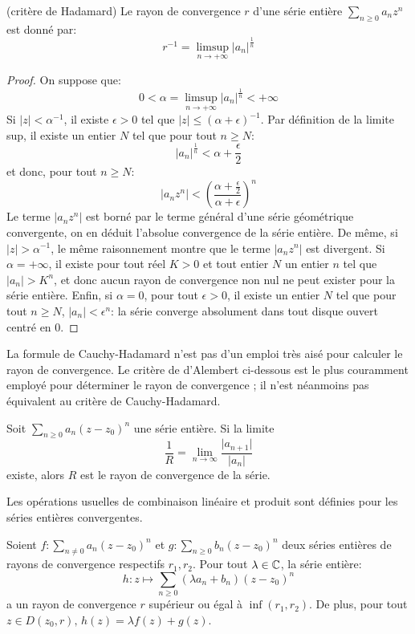 \begin{fprop}(critère de Hadamard)
Le rayon de convergence $r$ d'une série entière $\sum_{n \geq 0} a_n z^n$ est
donné par:
\[
r^{-1}=\limsup_{n \to +\infty} |a_n|^{\frac{1}{n}}
\]
\end{fprop}
\begin{proof}
On suppose que: 
\[
0 < \alpha = \limsup_{n \to +\infty} |a_n|^{\frac{1}{n}} <
+\infty
\]
Si $|z|<\alpha^{-1}$, il existe $\epsilon > 0$ tel que $|z|\leq
(\alpha+\epsilon)^{-1}$. Par définition de la limite sup, il existe un entier
$N$ tel que pour tout $n \geq N$:
\[
|a_n|^{\frac{1}{n}} < \alpha + \frac{\epsilon}{2}
\]
et donc, pour tout $n \geq N$:
\[
\left|a_nz^n\right|< \left(\frac{\alpha + \frac{\epsilon}{2}}{\alpha +
\epsilon}\right)^n
\]
Le terme $|a_nz^n|$ est borné par le terme général d'une série géométrique
convergente, on  en déduit l'absolue convergence de la série entière.
De même, si $|z|> \alpha^{-1}$, le même raisonnement montre que le terme
$\left|a_nz^n\right|$ est divergent. Si $\alpha = +\infty$, il existe pour tout
réel $K>0$ et tout entier $N$ un entier $n$ tel que $|a_n|>K^n$, et donc aucun
rayon de convergence non nul ne peut exister pour la série entière. Enfin, si
$\alpha = 0$, pour tout $\epsilon > 0$, il existe un entier $N$ tel que pour
tout $n \geq N$, $|a_n|<\epsilon^n$: la série converge absolument dans tout
disque ouvert centré en 0.
\end{proof}
La formule de Cauchy-Hadamard n'est pas d'un emploi très aisé pour calculer le rayon de convergence. Le critère de d'Alembert ci-dessous est le plus couramment employé pour déterminer le rayon de
convergence ; il n'est néanmoins pas équivalent au critère de Cauchy-Hadamard.
\begin{fprop}
Soit $\sum_{n \geq 0}a_n (z-z_0)^n$ une série entière. Si la limite
\[\frac{1}{R} = \lim_{n \to \infty}\frac{\lvert a_{n+1}\rvert}{ \lvert a_{n} \rvert}
\]
existe, alors $R$ est le rayon de convergence de la série.
\end{fprop} 
Les opérations usuelles de combinaison linéaire et produit sont définies pour les séries entières convergentes.
\begin{fprop}
Soient $f \colon \sum_{n \neq 0}a_n(z-z_0)^n$ et $g \colon \sum_{n \geq 0} b_n (z-z_0)^n$ deux séries entières de rayons de convergence respectifs $r_1,r_2$. Pour tout $\lambda \in \mathbb{C}$, la série entière:
\[
h \colon z \mapsto \sum_{n \geq 0} (\lambda a_n + b_n) (z-z_0)^n
\]
a un rayon de convergence $r$ supérieur ou égal à $\inf(r_1,r_2)$. De plus, pour tout $z \in D(z_0,r), \, h(z) = \lambda f(z) + g(z)$.
\end{fprop}

